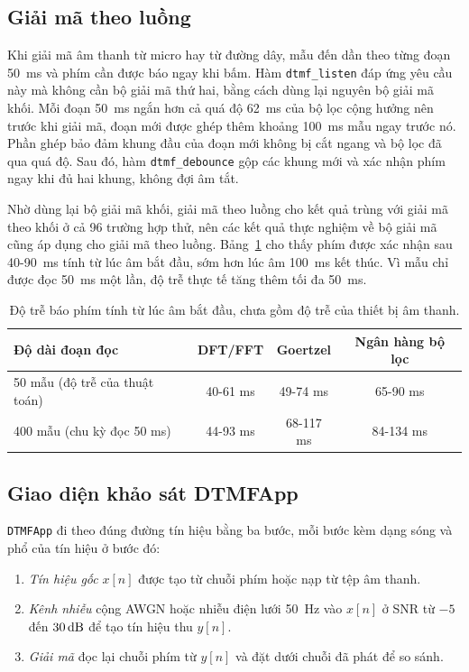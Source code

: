 \documentclass{dtmf_report}
\begin{document}
\subsection{Giải mã theo luồng}

Khi giải mã âm thanh từ micro hay từ đường dây, mẫu đến dần theo từng đoạn 50~ms
và phím cần được báo ngay khi bấm. Hàm \texttt{dtmf\_listen} đáp ứng yêu cầu này mà
không cần bộ giải mã thứ hai, bằng cách dùng lại nguyên bộ giải mã khối. Mỗi đoạn
50~ms ngắn hơn cả quá độ 62~ms của bộ lọc cộng hưởng nên trước khi giải mã, đoạn mới
được ghép thêm khoảng 100~ms mẫu ngay trước nó. Phần ghép bảo đảm khung đầu của
đoạn mới không bị cắt ngang và bộ lọc đã qua quá độ. Sau đó, hàm
\texttt{dtmf\_debounce} gộp các khung mới và xác nhận phím ngay khi đủ hai khung,
không đợi âm tắt.

Nhờ dùng lại bộ giải mã khối, giải mã theo luồng cho kết quả trùng với giải mã theo
khối ở cả 96 trường hợp thử, nên các kết quả thực nghiệm về bộ giải mã cũng áp dụng
cho giải mã theo luồng. Bảng~\ref{tab:do-tre} cho thấy phím được xác nhận sau
40-90~ms tính từ lúc âm bắt đầu, sớm hơn lúc âm 100~ms kết thúc. Vì mẫu chỉ được
đọc 50~ms một lần, độ trễ thực tế tăng thêm tối đa 50~ms.

\begin{table}[H]
\centering
\caption{Độ trễ báo phím tính từ lúc âm bắt đầu, chưa gồm độ trễ của thiết bị âm
thanh.}
\label{tab:do-tre}
\small
\begin{tabular}{l c c c}
\toprule
\textbf{Độ dài đoạn đọc} & \textbf{DFT/FFT} & \textbf{Goertzel} & \textbf{Ngân hàng bộ lọc} \\
\midrule
50 mẫu (độ trễ của thuật toán)      & 40-61 ms & 49-74 ms  & 65-90 ms \\
400 mẫu (chu kỳ đọc 50 ms)         & 44-93 ms & 68-117 ms & 84-134 ms \\
\bottomrule
\end{tabular}
\end{table}

\subsection{Giao diện khảo sát DTMFApp}

\texttt{DTMFApp} đi theo đúng đường tín hiệu bằng ba bước, mỗi bước kèm dạng sóng và phổ của tín hiệu ở bước đó:
\begin{enumerate}[label=\textbf{Bước \arabic*.}]
  \item \emph{Tín hiệu gốc} $x[n]$ được tạo từ chuỗi phím hoặc nạp từ tệp âm thanh.
  \item \emph{Kênh nhiễu} cộng AWGN hoặc nhiễu điện lưới 50~Hz vào $x[n]$ ở SNR từ $-5$ đến $30\,\mathrm{dB}$ để tạo tín hiệu thu $y[n]$.
  \item \emph{Giải mã} đọc lại chuỗi phím từ $y[n]$ và đặt dưới chuỗi đã phát để so sánh.
\end{enumerate}
\end{document}
